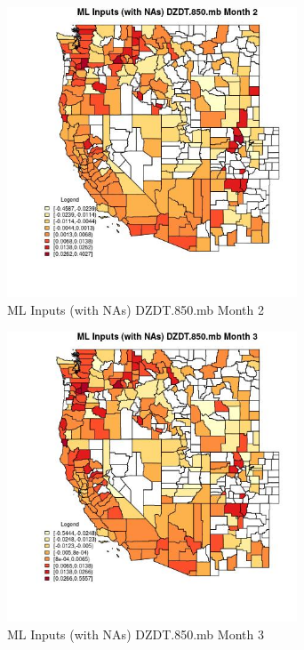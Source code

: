 \begin{figure} 
\centering  
\includegraphics[width=0.77\textwidth]{Code_Outputs/Report_ML_input_PM25_Step4_part_f_de_duplicated_aves_prioritize_24hr_obswNAs_CountyDZDT850mbmedianMonth2.jpg} 
\caption{\label{fig:Report_ML_input_PM25_Step4_part_f_de_duplicated_aves_prioritize_24hr_obswNAsCountyDZDT850mbmedianMonth2}ML Inputs (with NAs) DZDT.850.mb Month 2} 
\end{figure} 
 

\begin{figure} 
\centering  
\includegraphics[width=0.77\textwidth]{Code_Outputs/Report_ML_input_PM25_Step4_part_f_de_duplicated_aves_prioritize_24hr_obswNAs_CountyDZDT850mbmedianMonth3.jpg} 
\caption{\label{fig:Report_ML_input_PM25_Step4_part_f_de_duplicated_aves_prioritize_24hr_obswNAsCountyDZDT850mbmedianMonth3}ML Inputs (with NAs) DZDT.850.mb Month 3} 
\end{figure} 
 


